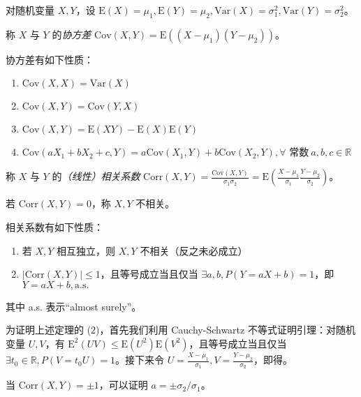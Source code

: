 \documentclass[../main.tex]{subfiles}
\begin{document}
对随机变量 $X,Y$，设 $\mathrm E(X)=\mu_1,\mathrm E(Y)=\mu_2,\mathrm{Var}(X)=\sigma_1^2,\mathrm{Var}(Y)=\sigma_2^2$。

\begin{definition}\label{def:4.4.1}
称 $X$ 与 $Y$ 的\emph{协方差} $\mathrm{Cov}(X,Y)=\mathrm E((X-\mu_1)(Y-\mu_2))$。
\end{definition}

\begin{proposition}
协方差有如下性质：
\begin{enumerate}
    \item $\mathrm{Cov}(X,X)=\mathrm{Var}(X)$
    \item $\mathrm{Cov}(X,Y)=\mathrm{Cov}(Y,X)$
    \item $\mathrm{Cov}(X,Y)=\mathrm E(XY)-\mathrm E(X)\mathrm E(Y)$
    \item $\mathrm{Cov}(aX_1+bX_2+c,Y)=a\mathrm{Cov}(X_1,Y)+b\mathrm{Cov}(X_2,Y),\forall\text{ 常数}\ a,b,c\in\mathbb R$
\end{enumerate}
\end{proposition}

\begin{definition}\label{def:4.4.2}
称 $X$ 与 $Y$ 的\emph{（线性）相关系数} $\mathrm{Corr}(X,Y)=\frac{\mathrm{Cov}(X,Y)}{\sigma_1\sigma_2}=\mathrm E(\frac{X-\mu_1}{\sigma_1}\frac{Y-\mu_2}{\sigma_2})$。
\end{definition}

若 $\mathrm{Corr}(X,Y)=0$，称 $X,Y$ 不相关。

\begin{theorem}\label{thm:4.4.1}
相关系数有如下性质：
\begin{enumerate}
    \item 若 $X,Y$ 相互独立，则 $X,Y$ 不相关（反之未必成立）
    \item $|\mathrm{Corr}(X,Y)|\leq1$，且等号成立当且仅当 $\exists a,b,P(Y=aX+b)=1$，即 $Y=aX+b,\mathrm{a.s.}$
\end{enumerate}
\end{theorem}

其中 a.s. 表示“almost surely”。

为证明上述定理的 (2)，首先我们利用 Cauchy-Schwartz 不等式证明引理：对随机变量 $U,V$，有 $\mathrm{E}^2(UV)\leq \mathrm{E}(U^2)\mathrm{E}(V^2)$，且等号成立当且仅当 $\exists t_0\in\mathbb R,P(V=t_0U)=1$。接下来令 $U=\frac{X-\mu_1}{\sigma_1},V=\frac{Y-\mu_2}{\sigma_2}$，即得。

当 $\mathrm{Corr}(X,Y)=\pm1$，可以证明 $a=\pm\sigma_2/\sigma_1$。
\end{document}
